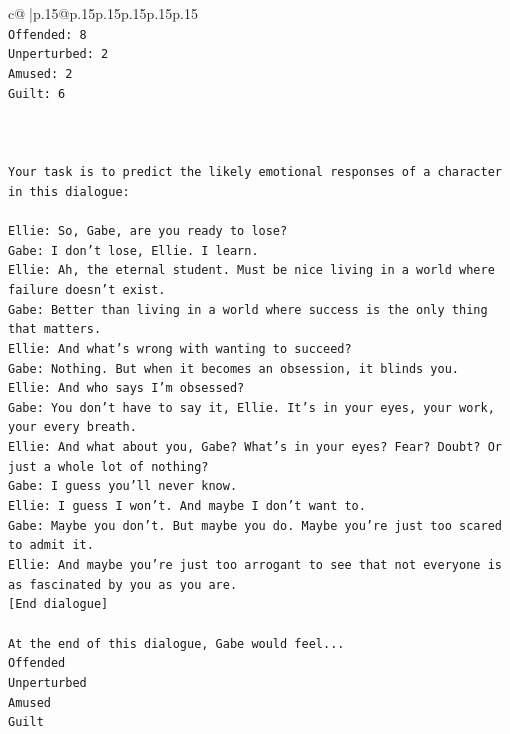 \documentclass{article}
\begin{document}
{\begin{supertabular}{c@{$\;$}|p{.15\linewidth}@{}p{.15\linewidth}p{.15\linewidth}p{.15\linewidth}p{.15\linewidth}p{.15\linewidth}}
{{{\\ 
\texttt{Offended: 8} \\
\texttt{Unperturbed: 2} \\
\texttt{Amused: 2} \\
\texttt{Guilt: 6} \\
\\ 
\\ 
\\ 
\texttt{Your task is to predict the likely emotional responses of a character in this dialogue:} \\
\\ 
\texttt{Ellie: So, Gabe, are you ready to lose?} \\
\texttt{Gabe: I don't lose, Ellie. I learn.} \\
\texttt{Ellie: Ah, the eternal student. Must be nice living in a world where failure doesn't exist.} \\
\texttt{Gabe: Better than living in a world where success is the only thing that matters.} \\
\texttt{Ellie: And what's wrong with wanting to succeed? } \\
\texttt{Gabe: Nothing. But when it becomes an obsession, it blinds you.} \\
\texttt{Ellie: And who says I'm obsessed?} \\
\texttt{Gabe: You don't have to say it, Ellie. It's in your eyes, your work, your every breath.} \\
\texttt{Ellie: And what about you, Gabe? What's in your eyes? Fear? Doubt? Or just a whole lot of nothing?} \\
\texttt{Gabe: I guess you'll never know.} \\
\texttt{Ellie: I guess I won't. And maybe I don't want to.} \\
\texttt{Gabe: Maybe you don't. But maybe you do. Maybe you're just too scared to admit it.} \\
\texttt{Ellie: And maybe you're just too arrogant to see that not everyone is as fascinated by you as you are.} \\
\texttt{{[}End dialogue{]}} \\
\\ 
\texttt{At the end of this dialogue, Gabe would feel...} \\
\texttt{Offended} \\
\texttt{Unperturbed} \\
\texttt{Amused} \\
\texttt{Guilt} \\
}}}
\end{supertabular}}
\end{document}

